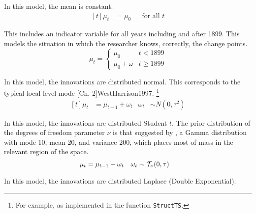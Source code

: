 \begin{description}[font = \normalfont\ModelII]
\item[Constant] In this model, the mean is constant.
  \begin{equation}
    \label{dlm:eq:21}
    \begin{aligned}[t]
      \mu_{t} &= \mu_{0} && \text{for all $t$}
    \end{aligned}
  \end{equation}
\item[Intervention] This includes an indicator variable for all years including and after 1899.
  This models the situation in which the researcher knows, correctly, the change points.
  \begin{equation}
    \mu_{t} = 
    \begin{cases}
      \mu_{0} & t < 1899 \\
      \mu_{0} + \omega & t \geq 1899
    \end{cases}
  \end{equation}
\item[Normal] In this model, the innovations are distributed normal.
  This corresponds to the typical local level mode \parencite[Ch. 2]{DurbinKoopman2012}[Ch. 2]{WestHarrison1997}.%
  \footnote{For example, as implemented in the \RLang{} function \texttt{StructTS}.}
  \begin{equation}
    \label{dlm:eq:11}
    \begin{aligned}[t]
      \mu_{t} &= \mu_{t - 1} + \omega_{t} & \omega_{t} & \sim N(0, \tau^{2})
    \end{aligned}
  \end{equation}
\item[StudentT] In this model, the innovations are distributed Student $t$.
  The prior distribution of the degrees of freedom parameter $\nu$ is that suggested by \textcites{JuarezSteel2010b}, a Gamma distribution with mode 10, mean 20, and variance 200, which places most of mass in the relevant region of the space.
  \begin{equation}
    \label{dlm:eq:18}
    \begin{aligned}[t]
      \mu_{t} &= \mu_{t - 1} + \omega_{t} & \omega_{t} & \sim \mathcal{T}_{\nu}\mathopen{}\left(0, \tau\right)\mathclose{}
    \end{aligned}
  \end{equation}
\item[Laplace] In this model, the innovations are distributed Laplace (Double Exponential):
  \begin{equation}
    \label{dlm:eq:22}

\end{equation}
\end{description}
